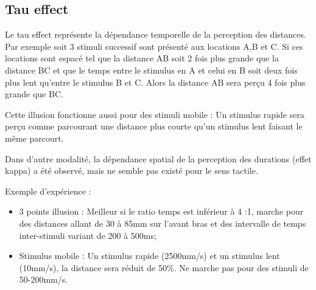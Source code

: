 \subsection{Tau effect}
Le tau effect représente la dépendance temporelle de la perception des distances. Par exemple soit 3 stimuli successif sont présenté aux locations A,B et C. Si ces locations sont espacé tel que la distance AB soit 2 fois plus grande que la distance BC et que le temps entre le stimulus en A et celui en B soit deux fois plus lent qu’entre le stimulus B et C. Alors la distance AB sera perçu 4 fois plus grande que BC.\par
Cette illusion fonctionne aussi pour des stimuli mobile : Un stimulus rapide sera perçu comme parcourant une distance plus courte qu’un stimulus lent faisant le même parcourt.\par
Dans d’autre modalité, la dépendance spatial de la perception des durations (effet kappa) a été observé, mais ne semble pas existé pour le sens tactile.\par
Exemple d’expérience :
\begin{itemize}
	\item 3 points illusion : Meilleur si le ratio temps est inférieur à 4 :1, marche pour des distances allant de 30 à 85mm sur l’avant bras et des intervalle de temps inter-stimuli variant de 200 à 500ms;
	\item Stimulus mobile : Un stimulus rapide (2500mm/s) et un stimulus lent (10mm/s), la distance sera réduit de 50\%. Ne marche pas pour des stimuli de 50-200mm/s.
\end{itemize}



